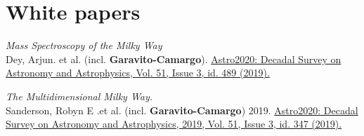 \documentclass[UTF8]{article}
\begin{document}
\section*{White papers}

\begin{etaremune}
\item \textit{Mass Spectroscopy of the Milky Way} \\
  Dey, Arjun. et al. (incl. \textbf{Garavito-Camargo}).
  \href{https://113qx216in8z1kdeyi404hgf-wpengine.netdna-ssl.com/wp-content/uploads/2019/05/489_dey.pdf}{Astro2020: Decadal
  Survey on Astronomy and Astrophysics, Vol. 51, Issue 3, id. 489 (2019).}
\item \textit{The Multidimensional Milky Way.}\\
 Sanderson, Robyn E .et al. (incl. \textbf{Garavito-Camargo}) 2019.
  \href{https://arxiv.org/abs/1909.07641}{Astro2020: Decadal Survey on
Astronomy and Astrophysics, 2019, Vol. 51, Issue 3, id. 347 (2019).} 
\end{etaremune}
\end{document}
